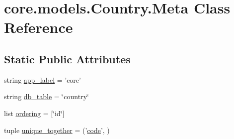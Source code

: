 \hypertarget{classcore_1_1models_1_1Country_1_1Meta}{\section{core.\-models.\-Country.\-Meta Class Reference}
\label{classcore_1_1models_1_1Country_1_1Meta}
}
\subsection*{Static Public Attributes}
\begin{DoxyCompactItemize}
\item 
string \hyperlink{classcore_1_1models_1_1Country_1_1Meta_a8dd201be91135b36e04c9a0f6ba17619}{app\-\_\-label} = 'core'
\item 
string \hyperlink{classcore_1_1models_1_1Country_1_1Meta_a1676c5aa35d719c3db2d23cac218e0d9}{db\-\_\-table} = \char`\"{}country\char`\"{}
\item 
list \hyperlink{classcore_1_1models_1_1Country_1_1Meta_a114a8de726b6f882bd21b909d8a1a34d}{ordering} = \mbox{[}\char`\"{}id\char`\"{}\mbox{]}
\item 
tuple \hyperlink{classcore_1_1models_1_1Country_1_1Meta_a711ed9131f1b18061962ae4523d0a716}{unique\-\_\-together} = ('\hyperlink{classcore_1_1models_1_1Country_a0e69789f36a5e3ae61532a9cf69763a5}{code}', )
\end{DoxyCompactItemize}



